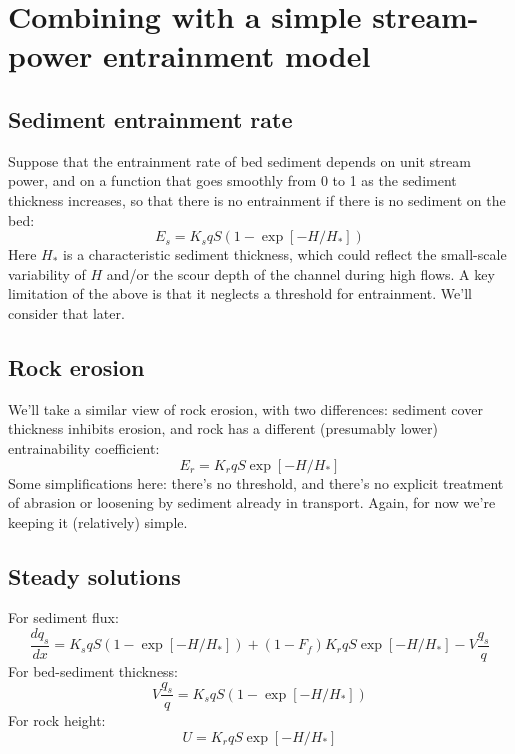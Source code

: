 \documentclass[12pt]{amsart}
\begin{document}
\section{Combining with a simple stream-power entrainment model}

\subsection{Sediment entrainment rate}

Suppose that the entrainment rate of bed sediment depends on unit stream power, and on a function that goes smoothly from 0 to 1 as the sediment thickness increases, so that there is no entrainment if there is no sediment on the bed:
\begin{equation}
E_s = K_s q S ( 1 - \exp [-H/H_*] )
\end{equation}
Here $H_*$ is a characteristic sediment thickness, which could reflect the small-scale variability of $H$ and/or the scour depth of the channel during high flows. A key limitation of the above is that it neglects a threshold for entrainment. We'll consider that later.

\subsection{Rock erosion}

We'll take a similar view of rock erosion, with two differences: sediment cover thickness inhibits erosion, and rock has a different (presumably lower) entrainability coefficient:
\begin{equation}
E_r = K_r q S \exp [-H/H_*] 
\end{equation}
Some simplifications here: there's no threshold, and there's no explicit treatment of abrasion or loosening by sediment already in transport. Again, for now we're keeping it (relatively) simple.

\subsection{Steady solutions}

For sediment flux:
\begin{equation}
\frac{dq_s}{dx} = K_s q S ( 1 - \exp [-H/H_*] ) + (1-F_f) K_r q S \exp [-H/H_*] - V\frac{q_s}{q}
\end{equation}
For bed-sediment thickness:
\begin{equation}
V\frac{q_s}{q} = K_s q S ( 1 - \exp [-H/H_*] )
\label{Vqsq}
\end{equation}
For rock height:
\begin{equation}
U = K_r q S \exp [-H/H_*]
\label{U}
\end{equation}
\end{document}
